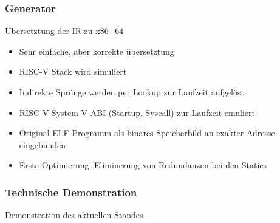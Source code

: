 
\begin{frame}
    \frametitle{Generator}{Übersetztung der IR zu x86\_64}
    \pause
    \begin{itemize}
        \item Sehr einfache, aber korrekte übersetztung
              \pause
        \item RISC-V Stack wird simuliert %
              \pause
        \item Indirekte Sprünge werden per Lookup zur Laufzeit aufgelöst
              \pause
        \item RISC-V System-V ABI (Startup, Syscall) zur Laufzeit emuliert
              \pause
        \item Original ELF Programm als binäres Speicherbild an exakter Adresse eingebunden
              \pause
        \item Erste Optimierung: Eliminerung von Redundanzen bei den Statics
    \end{itemize}
\end{frame}
\clearpage


\begin{frame}
    \frametitle{Technische Demonstration}{Demonstration des aktuellen Standes}

\end{frame}
\clearpage

